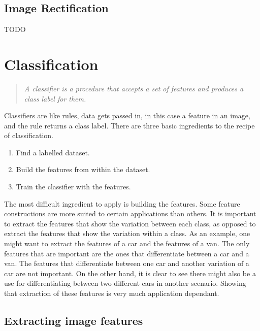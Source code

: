 \documentclass[11pt,oneside]{report}
\begin{document}
				\subsection{Image Rectification}
				 TODO
				
			\section{Classification}
				\begin{quote}
					\textit{A classifier is a procedure that accepts a set of features and produces a class label for them.}
					\cite[p. 487]{book:modern}
				\end{quote}
				Classifiers are like rules, data gets passed in, in this case a feature in an image, and the rule returns a class label.
				There are three basic ingredients to the recipe of classification.
				\begin{enumerate}
					\item{Find a labelled dataset.}
					\item{Build the features from within the dataset.}
					\item{Train the classifier with the features.}
				\end{enumerate}
				The most difficult ingredient to apply is building the features.
				Some feature constructions are more suited to certain applications than others.
				It is important to extract the features that show the variation between each class, as opposed to extract the features that show the variation within a class.
				As an example, one might want to extract the features of a car and the features of a van.
				The only features that are important are the ones that differentiate between a car and a van.
				The features that differentiate between one car and another variation of a car are not important.
				On the other hand, it is clear to see there might also be a use for differentiating between two different cars in another scenario.
				Showing that extraction of these features is very much application dependant.
				
				\subsection{Extracting image features}
\end{document}
